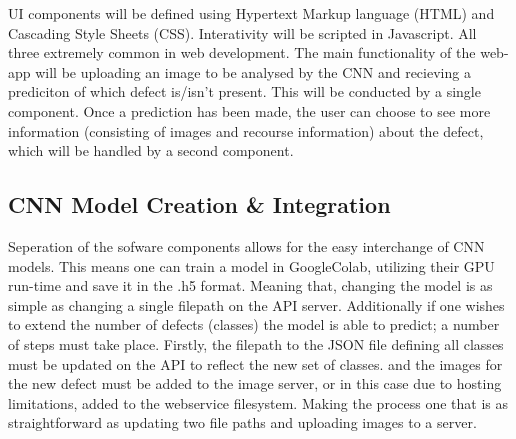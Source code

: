       UI components will be defined using Hypertext Markup language (HTML) and Cascading Style Sheets (CSS). Interativity will be scripted in Javascript. All three extremely common in web development. %
      The main functionality of the web-app will be uploading an image to be analysed by the CNN and recieving a prediciton of which defect is/isn't present. This will be conducted by a single component. Once a prediction has been made, the user can choose to see more information (consisting of images and recourse information) about the defect, which will be handled by a second component.

    \subsection{CNN Model Creation & Integration}
      Seperation of the sofware components allows for the easy interchange of CNN models. This means one can train a model in GoogleColab, utilizing their GPU run-time and save it in the .h5 format. Meaning that, changing the model is as simple as changing a single filepath on the API server. Additionally if one wishes to extend the number of defects (classes) the model is able to predict; a number of steps must take place. Firstly, the filepath to the JSON file defining all classes must be updated on the API to reflect the new set of classes. and the images for the new defect must be added to the image server, or in this case due to hosting limitations, added to the webservice filesystem. Making the process one that is as straightforward as updating two file paths and uploading images to a server.

